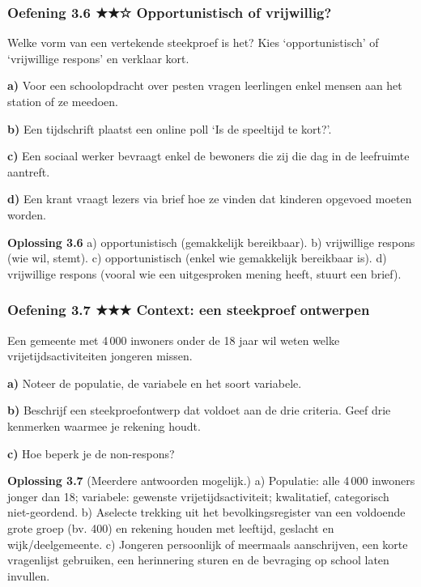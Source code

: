 \subsubsection*{Oefening 3.6 \quad ★★☆ \quad Opportunistisch of vrijwillig?}

Welke vorm van een vertekende steekproef is het? Kies ‘opportunistisch’ of ‘vrijwillige respons’ en verklaar kort.

\textbf{a)} Voor een schoolopdracht over pesten vragen leerlingen enkel mensen aan het station of ze meedoen. \lijn

\textbf{b)} Een tijdschrift plaatst een online poll ‘Is de speeltijd te kort?’. \lijn

\textbf{c)} Een sociaal werker bevraagt enkel de bewoners die zij die dag in de leefruimte aantreft. \lijn

\textbf{d)} Een krant vraagt lezers via brief hoe ze vinden dat kinderen opgevoed moeten worden. \lijn

\begin{oplossing}
\textbf{Oplossing 3.6} \quad a) opportunistisch (gemakkelijk bereikbaar). b) vrijwillige respons (wie wil, stemt). c) opportunistisch (enkel wie gemakkelijk bereikbaar is). d) vrijwillige respons (vooral wie een uitgesproken mening heeft, stuurt een brief).
\end{oplossing}

\subsubsection*{Oefening 3.7 \quad ★★★ \quad Context: een steekproef ontwerpen}

Een gemeente met 4\,000 inwoners onder de 18 jaar wil weten welke vrijetijdsactiviteiten jongeren missen.

\textbf{a)} Noteer de populatie, de variabele en het soort variabele. \lijn

\textbf{b)} Beschrijf een steekproefontwerp dat voldoet aan de drie criteria. Geef drie kenmerken waarmee je rekening houdt. \lijn

\textbf{c)} Hoe beperk je de non-respons? \lijn

\begin{oplossing}
\textbf{Oplossing 3.7} \quad (Meerdere antwoorden mogelijk.) a) Populatie: alle 4\,000 inwoners jonger dan 18; variabele: gewenste vrijetijdsactiviteit; kwalitatief, categorisch niet-geordend. b) Aselecte trekking uit het bevolkingsregister van een voldoende grote groep (bv. 400) en rekening houden met leeftijd, geslacht en wijk/deelgemeente. c) Jongeren persoonlijk of meermaals aanschrijven, een korte vragenlijst gebruiken, een herinnering sturen en de bevraging op school laten invullen.
\end{oplossing}

